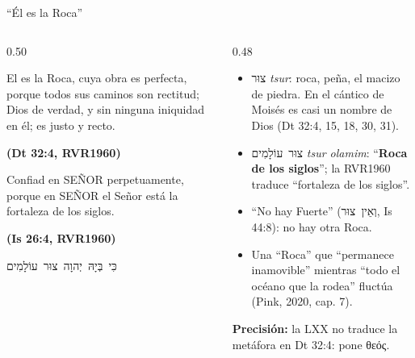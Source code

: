 \documentclass[hyperref={bookmarks=false},aspectratio=169]{beamer}
\newcommand{\heb}[1]{\mbox{\foreignlanguage{hebrew}{#1}}}
\newcommand{\grc}[1]{\foreignlanguage{ancientgreek}{#1}}
\newcommand{\SENOR}{S{\fontsize{0.78em}{1em}\selectfont EÑOR}}
\newcommand{\fuente}[1]{\par\hfill{\upshape\bfseries\footnotesize\textcolor{azul}{#1}}}
\newcommand{\destacar}[1]{\textbf{\textcolor{azul}{#1}}}
\newcommand{\precision}[1]{{\footnotesize\color{gris}\textbf{Precisión:} #1}}
\begin{document}
\begin{frame}{``Él es la Roca''}
\begin{columns}[t,onlytextwidth]
\begin{column}{0.50\textwidth}
\begin{cita}El es la Roca, cuya obra es perfecta, porque todos sus caminos son rectitud; Dios de verdad, y sin ninguna iniquidad en él; es justo y recto.\fuente{(Dt 32:4, RVR1960)}\end{cita}
\begin{cita}Confiad en \SENOR{} perpetuamente, porque en \SENOR{} el Señor está la fortaleza de los siglos.\fuente{(Is 26:4, RVR1960)}\end{cita}
\begin{center}\heb{כִּי בְּיָהּ יְהוָה צוּר עוֹלָמִים}\end{center}
\end{column}
\begin{column}{0.48\textwidth}\small
\begin{itemize}
\item \heb{צוּר} \emph{tsur}: roca, peña, el macizo de piedra. En el cántico de Moisés es casi un nombre de Dios (Dt 32:4, 15, 18, 30, 31).
\item \heb{צוּר עוֹלָמִים} \emph{tsur olamim}: ``\destacar{Roca de los siglos}''; la RVR1960 traduce ``fortaleza de los siglos''.
\item ``No hay Fuerte'' (\heb{וְאֵין צוּר}, Is 44:8): no hay otra Roca.
\item Una ``Roca'' que ``permanece inamovible'' mientras ``todo el océano que la rodea'' fluctúa (Pink, 2020, cap. 7).
\end{itemize}
\precision{la LXX no traduce la metáfora en Dt 32:4: pone \grc{θεός}.}
\end{column}
\end{columns}
\end{frame}
\end{document}
